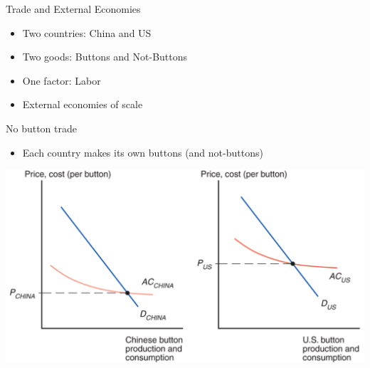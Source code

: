 \documentclass[ignorenonframetext,]{beamer}
\begin{document}
\begin{frame}{Trade and External Economies}

    \begin{itemize}
        \item Two countries: China and US
        \item Two goods: Buttons and Not-Buttons
        \item One factor: Labor
        \item External economies of scale
    \end{itemize}

\end{frame}

\begin{frame}{No button trade}

    \begin{itemize}
        \item Each country makes its own buttons (and not-buttons)
    \end{itemize}
    \includegraphics[scale=0.20]{buttons_aut.png}

\end{frame}
\end{document}
